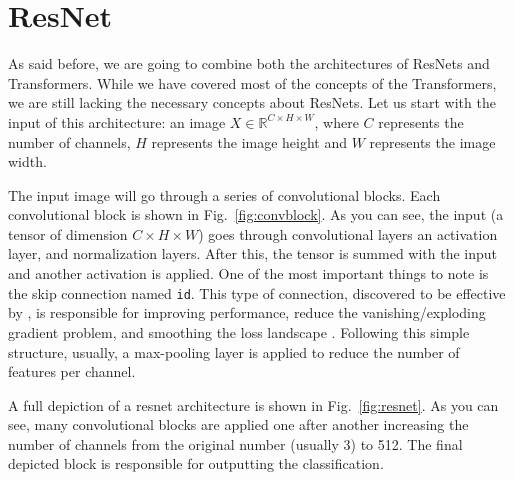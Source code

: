 \section{ResNet}\label{sect:resnet}
As said before, we are going to combine both the architectures of ResNets and Transformers. While we have covered most of the concepts of the Transformers, we are still lacking the necessary concepts about ResNets. Let us start with the input of this architecture: an image $X\in\mathbb{R}^{C\times H \times W}$, where $C$ represents the number of channels, $H$ represents the image height and $W$ represents the image width.

The input image will go through a series of convolutional blocks. Each convolutional block is shown in Fig.~\ref{fig:convblock}. As you can see, the input (a tensor of dimension $C\times H \times W$) goes through convolutional layers an activation layer, and normalization layers. After this, the tensor is summed with the input and another activation is applied. One of the most important things to note is the skip connection named \texttt{id}. This type of connection, discovered to be effective by \cite{He16}, is responsible for improving performance, reduce the vanishing/exploding gradient problem, and smoothing the loss landscape \cite{Li17}. Following this simple structure, usually, a max-pooling layer is applied to reduce the number of features per channel. 

A full depiction of a resnet architecture is shown in Fig.~\ref{fig:resnet}. As you can see, many convolutional blocks are applied one after another increasing the number of channels from the original number (usually 3) to 512. The final depicted block is responsible for outputting the classification. 

